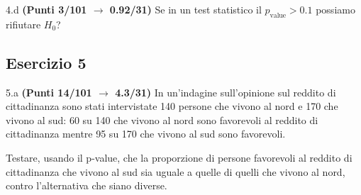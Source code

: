 \documentclass[
  11pt,
]{book}
\theoremstyle{mytheoremstyle}
\theoremstyle{mydefstyle}
\begin{document}
4.d \textbf{(Punti 3/101 \(\rightarrow\) 0.92/31)} Se in un test statistico il \(p_\text{value}>0.1\) possiamo rifiutare \(H_0\)?

\subsection{Esercizio 5}\label{esercizio-5-9}

5.a \textbf{(Punti 14/101 \(\rightarrow\) 4.3/31)} In un'indagine sull'opinione sul reddito di cittadinanza sono stati intervistate 140 persone che vivono al nord e 170 che vivono al sud: 60 su 140 che vivono al nord sono favorevoli al reddito di cittadinanza mentre 95 su 170 che vivono al sud sono favorevoli.

Testare, usando il p-value, che la proporzione di persone favorevoli al reddito di cittadinanza che vivono al sud sia uguale a quelle di quelli che vivono al nord, contro l'alternativa che siano diverse.
\end{document}
